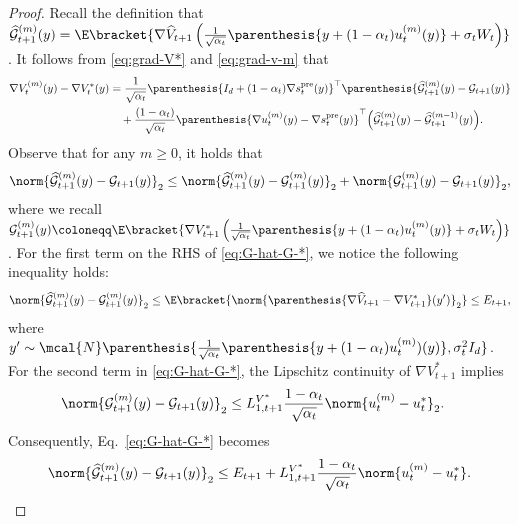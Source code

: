 \documentclass{article}
\begin{document}
\begin{proof}
    Recall the definition that $ \widehat{\mathcal{G}}_{t+1}^{(m)}(y)  = \E\bracket{\nabla \widehat{V}_{t+1}\left(\frac{1}{\sqrt{\alpha_t}}\parenthesis{y + (1 - \alpha_t)u_t^{(m)}(y)} + \sigma_t W_t\right)}$. It follows from \eqref{eq:grad-V*} and \eqref{eq:grad-v-m} that
\begin{align}
     \nabla V_{t}^{(m)}(y) -  \nabla V_{t}^{*}(y)  & =\frac{1}{\sqrt{\alpha_t}}\parenthesis{I_d
  + (1 - \alpha_t) \nabla s_t^{\rm pre}(y)}^\top\parenthesis{\widehat{\mathcal{G}}_{t+1}^{(m)}(y) - \mathcal{G}_{t+1}(y)} \nonumber \\ & \quad + \frac{(1 - \alpha_{t})}{\sqrt{\alpha_{t}}}\parenthesis{\nabla u_t^{(m)}(y) - \nabla s_t^{\rm pre}(y)}^\top \Big(\widehat{\mathcal{G}}_{t+1}^{(m)}(y)-\widehat{\mathcal{G}}_{t+1}^{(m-1)}(y)\Big).\label{eq:nable-V-n-V-*}
 \end{align}
Observe that for any $m \geq 0$, it holds that
\begin{align}
    \norm{\widehat{\mathcal{G}}_{t+1}^{(m)}(y)-\mathcal{G}_{t+1}(y)}_2 \leq \norm{\widehat{\mathcal{G}}_{t+1}^{(m)}(y)-\mathcal{G}_{t+1}^{(m)}(y)}_2 + \norm{\mathcal{G}_{t+1}^{(m)}(y)-\mathcal{G}_{t+1}(y)}_2, \label{eq:G-hat-G-*}
\end{align}
where we recall $\mathcal{G}_{t+1}^{(m)}(y)  \coloneqq \E\bracket{\nabla {V}^*_{t+1}\left(\frac{1}{\sqrt{\alpha_t}}\parenthesis{y + (1 - \alpha_t)u_t^{(m)}(y)} + \sigma_t W_t\right)}$.
For the first term on the RHS of \eqref{eq:G-hat-G-*}, we notice the following inequality holds:
\begin{align}
\norm{\widehat{\mathcal{G}}_{t+1}^{(m)}(y) - \mathcal{G}_{t+1}^{(m)}(y)}_{2}   \leq \E\bracket{\norm{\parenthesis{\nabla \widehat{V}_{t+1} - \nabla V^{*}_{t+1}}(y')}_{2}} \leq E_{t+1}, \label{eq:G-hat-G-n}
\end{align}
where $ y' \sim \mcal{N}\parenthesis{\frac{1}{\sqrt{\alpha_t}}\parenthesis{y + (1 - \alpha_t)u_t^{(m)})(y)}, \sigma_t^2 I_d} $. For the second term in \eqref{eq:G-hat-G-*}, the Lipschitz continuity of $\nabla V_{t+1}^*$ implies
\begin{align}
    \norm{\mathcal{G}^{(m)}_{t+1}(y)-\mathcal{G}_{t+1}(y)}_{2} & \leq L_{1, t+1}^{V^{*}} \frac{1 - \alpha_{t}}{\sqrt{\alpha_{t}}}\norm{u_{t}^{(m)} - u_{t}^{*}}_2. \label{eq:G*-n}
\end{align}
Consequently, Eq.~\eqref{eq:G-hat-G-*} becomes
\begin{align}
    \norm{\widehat{\mathcal{G}}_{t+1}^{(m)}(y)-\mathcal{G}_{t+1}(y)}_2 \leq E_{t+1} + L_{1, t+1}^{V^{*}} \frac{1 - \alpha_{t}}{\sqrt{\alpha_{t}}}\norm{u_{t}^{(m)} - u_{t}^{*}}. \label{eq:G-hat-G-*-new}
\end{align}


\end{proof}
\end{document}
